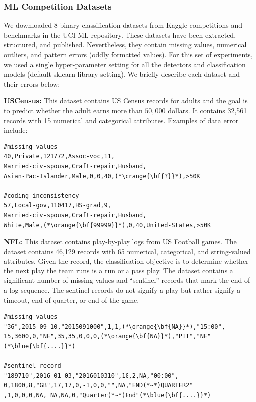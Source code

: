 \subsubsection{ML Competition Datasets}\label{exp:comp}
We downloaded 8 binary classification datasets from Kaggle competitions and benchmarks in the UCI ML repository.  
These datasets have been extracted, structured, and published.
Nevertheless, they contain missing values, numerical outliers, and pattern errors (oddly formatted values).
For this set of experiments, we used a single hyper-parameter setting for all the detectors and classification models (default \textsf{sklearn} library setting). 
We briefly describe each dataset and their errors below:

\vspace{0.5em}\noindent\textbf{USCensus: } This dataset contains US Census records for adults and the goal is to predict  whether the adult earns more than $50,000$ dollars. It contains 32,561 records with 15 numerical and categorical attributes. Examples of data error include:
\begin{lstlisting}
#missing values
40,Private,121772,Assoc-voc,11,
Married-civ-spouse,Craft-repair,Husband, 
Asian-Pac-Islander,Male,0,0,40,(*\orange{\bf{?}}*),>50K

#coding inconsistency
57,Local-gov,110417,HS-grad,9,
Married-civ-spouse,Craft-repair,Husband,
White,Male,(*\orange{\bf{99999}}*),0,40,United-States,>50K
\end{lstlisting}

\vspace{0.5em}\noindent\textbf{NFL: } This dataset contains play-by-play logs from US Football games. The dataset contains 46,129 records with 65 numerical, categorical, and string-valued attributes. Given the record, the classification objective is to determine whether the next play the team runs is a run or a pass play.
The dataset contains a significant number of missing values and ``sentinel'' records that mark the end of a log sequence. The sentinel records do not signify a play but rather signify a timeout, end of quarter, or end of the game.
\begin{lstlisting}
#missing values
"36",2015-09-10,"2015091000",1,1,(*\orange{\bf{NA}}*),"15:00",
15,3600,0,"NE",35,35,0,0,0,(*\orange{\bf{NA}}*),"PIT","NE"(*\blue{\bf{....}}*)

#sentinel record
"189710",2016-01-03,"2016010310",10,2,NA,"00:00",
0,1800,8,"GB",17,17,0,-1,0,0,"",NA,"END(*~*)QUARTER2"
,1,0,0,0,NA, NA,NA,0,"Quarter(*~*)End"(*\blue{\bf{....}}*)
\end{lstlisting}

